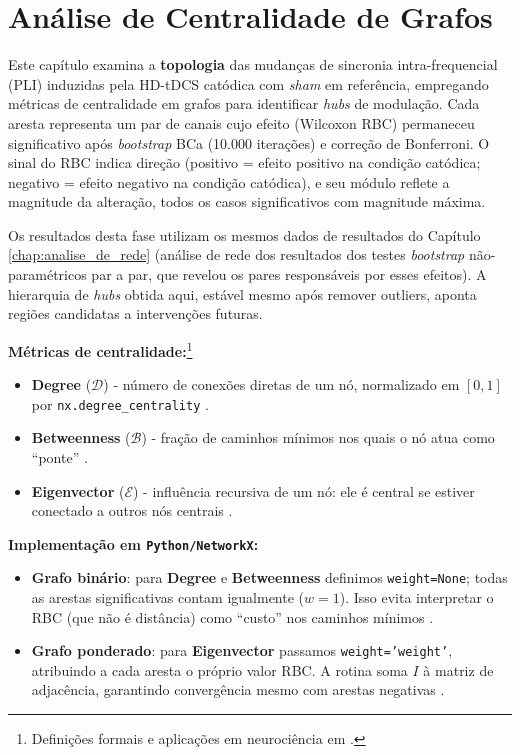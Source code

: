 \chapter{Análise de Centralidade de Grafos}
\label{chap:analise_centralidade_de_grafos}


Este capítulo examina a \textbf{topologia} das mudanças de sincronia intra-frequencial (PLI) induzidas pela HD-tDCS catódica com \textit{sham} em referência, empregando métricas de centralidade em grafos para identificar \textit{hubs} de modulação. Cada aresta representa um par de canais cujo efeito (Wilcoxon RBC) permaneceu significativo após \textit{bootstrap} BCa (10.000 iterações) e correção de Bonferroni. O sinal do RBC indica direção (positivo = efeito positivo na condição catódica; negativo = efeito negativo na condição catódica), e seu módulo reflete a magnitude da alteração, todos os casos significativos com magnitude máxima.

Os resultados desta fase utilizam os mesmos dados de resultados do Capítulo \ref{chap:analise_de_rede} (análise de rede dos resultados dos testes \textit{bootstrap} não-paramétricos par a par, que revelou os pares responsáveis por esses efeitos). A hierarquia de \textit{hubs} obtida aqui, estável mesmo após remover outliers, aponta regiões candidatas a intervenções futuras.

\bigskip
\noindent\textbf{Métricas de centralidade:}\footnote{Definições formais e aplicações em neurociência em .}
\begin{itemize}
  \item \textbf{Degree} (\(\mathcal{D}\)) - número de conexões diretas de um nó, normalizado em \([0,1]\) por \texttt{nx.degree\_centrality} \cite{networkx_doc}.
  \item \textbf{Betweenness} (\(\mathcal{B}\)) - fração de caminhos mínimos nos quais o nó atua como ``ponte'' \cite{freeman1977centrality}.
  \item \textbf{Eigenvector} (\(\mathcal{E}\)) - influência recursiva de um nó: ele é central se estiver conectado a outros nós centrais \cite{lohmann2010eigenvector}.
\end{itemize}

\noindent\textbf{Implementação em \texttt{Python/NetworkX}:}
\begin{itemize}
    \item \textbf{Grafo binário}: para \textbf{Degree} e \textbf{Betweenness} definimos \texttt{weight=None}; todas as arestas significativas contam igualmente (\(w=1\)). Isso evita interpretar o RBC (que não é distância) como ``custo'' nos caminhos mínimos \cite{networkx_doc}.
    \item \textbf{Grafo ponderado}: para \textbf{Eigenvector} passamos \texttt{weight='weight'}, atribuindo a cada aresta o próprio valor RBC. A rotina soma \(I\) à matriz de adjacência, garantindo convergência mesmo com arestas negativas \cite{networkx_doc}.
\end{itemize}

